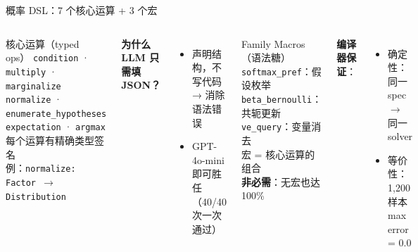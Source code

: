 \documentclass[aspectratio=169,10pt]{beamer}
\newcommand{\pos}[1]{\textcolor{positive}{#1}}
\begin{document}
\begin{frame}{概率 DSL：7 个核心运算 + 3 个宏}
\vspace{2pt}

\begin{columns}[T]
\begin{exampleblock}{核心运算（typed ops）}
{\small
\texttt{condition} · \texttt{multiply} · \texttt{marginalize}\\
\texttt{normalize} · \texttt{enumerate\_hypotheses}\\
\texttt{expectation} · \texttt{argmax}\\[4pt]
每个运算有精确类型签名\\
例：\texttt{normalize: Factor $\to$ Distribution}
}
\end{exampleblock}

\vspace{4pt}
\textbf{为什么 LLM 只需填 JSON？}
\begin{itemize}
    \item 声明结构，不写代码 → 消除语法错误
    \item \pos{GPT-4o-mini 即可胜任}（40/40 次一次通过）
\end{itemize}

\begin{exampleblock}{Family Macros（语法糖）}
{\small
\texttt{softmax\_pref}：假设枚举\\
\texttt{beta\_bernoulli}：共轭更新\\
\texttt{ve\_query}：变量消去\\[4pt]
宏 = 核心运算的组合\\
\textbf{非必需}：无宏也达 100\%
}
\end{exampleblock}

\vspace{4pt}
\textbf{编译器保证}：
\begin{itemize}
    \item 确定性：同一 spec $\to$ 同一 solver
    \item 等价性：1,200 样本 max error = \pos{0.0}
\end{itemize}
\end{columns}
\end{frame}
\end{document}
